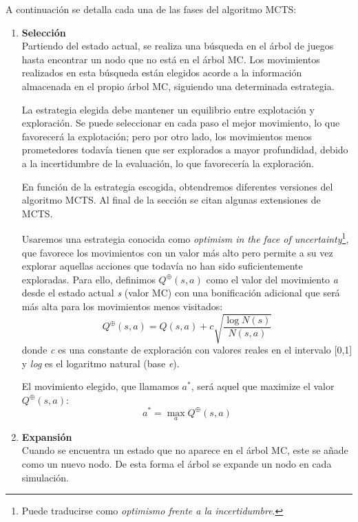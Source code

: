A continuación se detalla cada una de las fases del algoritmo MCTS:
\begin{enumerate}
	\item \textbf{Selección} \\
	Partiendo del estado actual, se realiza una búsqueda en el árbol de juegos hasta encontrar un nodo que no está en el árbol MC.
	Los movimientos realizados en esta búsqueda están elegidos acorde a la información almacenada en el propio árbol MC, siguiendo una determinada estrategia.
	
La estrategia elegida debe mantener un equilibrio entre explotación y exploración.
Se puede seleccionar en cada paso el mejor movimiento, lo que favorecerá la explotación; pero por otro lado, los movimientos menos prometedores todavía tienen que ser explorados a mayor profundidad, debido a la incertidumbre de la evaluación, lo que favorecería la exploración.

En función de la estrategia escogida, obtendremos diferentes versiones del algoritmo MCTS.
Al final de la sección se citan algunas extensiones de MCTS.

Usaremos una estrategia conocida como \textit{optimism in the face of uncertainty}\footnote{Puede traducirse como \textit{optimismo frente a la incertidumbre}.}, que favorece los movimientos con un valor más alto pero permite a su vez explorar aquellas acciones que todavía no han sido suficientemente exploradas.
Para ello, definimos $Q^\oplus(s,a)$ como el valor del movimiento \textit{a} desde el estado actual \textit{s} (valor MC) con una bonificación adicional que será más alta para los movimientos menos visitados:
\begin{displaymath}
Q^\oplus(s,a) = Q(s,a) + c\sqrt{\dfrac{\log N(s)}{N(s,a)}}
\end{displaymath}
donde \textit{c} es una constante de exploración con valores reales en el intervalo [0,1] y \textit{log} es el logaritmo natural (base \textit{e}).

El movimiento elegido, que llamamos $a^\ast$, será aquel que maximize el valor $Q^\oplus(s,a)$:
\begin{displaymath}
a^\ast = \max_a{Q^\oplus(s,a)}
\end{displaymath}

	\item \textbf{Expansión} \\
	Cuando se encuentra un estado que no aparece en el árbol MC, este se añade como un nuevo nodo.
	De esta forma el árbol se expande un nodo en cada simulación.


\end{enumerate}

